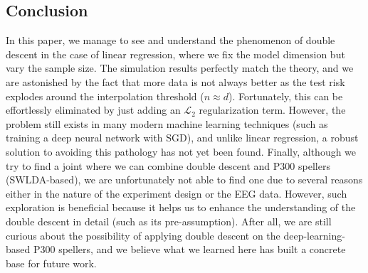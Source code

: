 \documentclass{article}
\begin{document}
\subsection{Conclusion}	
In this paper, we manage to see and understand the phenomenon of double descent in the case of linear regression, where we fix the model dimension but vary the sample size. The simulation results perfectly match the theory, and we are astonished by the fact that more data is not always better as the test risk explodes around the interpolation threshold ($n \approx d$). Fortunately, this can be effortlessly eliminated by just adding an $\mathcal{L}_2$ regularization term. However, the problem still exists in many modern machine learning techniques (such as training a deep neural network with SGD), and unlike linear regression, a robust solution to avoiding this pathology has not yet been found. Finally, although we try to find a joint where we can combine double descent and P300 spellers (SWLDA-based), we are unfortunately not able to find one due to several reasons either in the nature of the experiment design or the EEG data. However, such exploration is beneficial because it helps us to enhance the understanding of the double descent in detail (such as its pre-assumption). After all, we are still curious about the possibility of applying double descent on the deep-learning-based P300 spellers, and we believe what we learned here has built a concrete base for future work.

\newpage

{\small }
\end{document}
